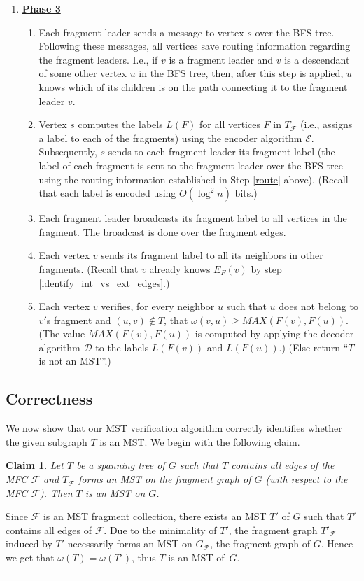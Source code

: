 \documentclass[11pt,letter]{article}
\def\cD{\mathcal{D}}
\def\cE{\mathcal{E}}
\def\cD{\mathcal{D}}
\def\cF{\mathcal{F}}
\newtheorem{claim}[theorem]{Claim}
\newcommand{\qed}{\rule{7pt}{7pt}}
\newenvironment{proof}{\noindent{\bf Proof}\hspace*{1em}}{\qed\bigskip}
\begin{document}
\begin{enumerate}
\item 
{\bf \underline{Phase 3}}
\begin{enumerate} 
\item \label{route}
Each fragment leader sends a message to vertex $s$ over the BFS tree. 
Following these messages, all vertices save routing information regarding the fragment leaders.
I.e., if $v$ is a fragment leader and $v$ is a descendant of some other vertex $u$ in the BFS tree, then, 
after this step is applied, $u$ knows which of its children is on the path connecting it to  the fragment leader $v$.
\item \label{encode}
Vertex $s$ computes  the labels $L(F)$ for all vertices $F$ in $T_{\cF}$
(i.e., assigns a label to each of the fragments) 
using the encoder algorithm $\cE$. Subsequently, $s$ sends to each 
fragment leader its fragment label 
(the label of each fragment is sent to the fragment leader over the BFS tree 
using the routing information established in Step \ref{route} above).
(Recall that each label is encoded using $O(\log^2 n)$ bits.)
\item \label{send_labels_leaders}
Each fragment leader broadcasts its fragment label to all vertices in the fragment. The broadcast is done over the fragment edges.
\item \label{send_labels_neig}
Each vertex $v$ sends its fragment label to all its neighbors in other 
fragments. (Recall that $v$ already knows $E_F(v)$ by step 
\ref{identify_int_vs_ext_edges}.)
\item \label{verify_cycle_heavy}Each vertex $v$ verifies, for every 
neighbor $u$ such that $u$ does not belong to $v'$s fragment and 
$(u,v)\notin T$, that $\omega(v,u)\ge MAX(F(v), F(u))$. 
(The value $MAX(F(v), F(u))$ is computed by applying 
the decoder algorithm $\cD$ to the labels $L(F(v))$ and $L(F(u))$.) 
(Else return ``$T$ is not an MST''.)
\end{enumerate}
\end{enumerate}

\subsection{Correctness}

We now show that our MST verification algorithm correctly identifies whether 
the given subgraph $T$ is an MST. We begin with the following claim.

\begin{claim} \label{clm_fragmet_mst}
Let $T$ be a spanning tree of $G$ such that $T$ contains all edges of the MFC 
$\cF$ and $T_{\cF}$ forms an MST on the fragment graph of $G$ (with respect 
to  the MFC $\cF$). Then $T$ is an MST on $G$.
\end{claim}
\begin{proof} 
Since $\cF$ is an MST fragment collection, there exists an MST $T'$ of $G$ 
such that $T'$ contains all edges of $\cF$. Due to the minimality 
of $T'$, the fragment graph $T'_{\cF}$ induced by $T'$ necessarily forms 
an MST on $G_{\cF}$, the fragment graph of $G$. 
Hence we get that $\omega(T)=\omega(T')$, thus $T$ is an MST of~$G$.
\end{proof}
\end{document}
